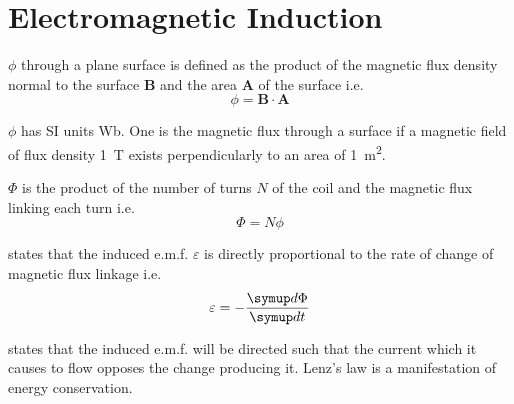 \documentclass[Physics.tex]{subfiles}
\begin{document}
\chapter{Electromagnetic Induction}
 \(\phi\) through a plane surface is defined as the product of the magnetic flux density normal to the surface \(\mathbf{B}\) and the area \(\mathbf{A}\) of the surface i.e. \begin{equation}\phi = \mathbf{B} \cdot \mathbf{A}\end{equation}

\(\phi\) has SI units \si{\weber}. One  is the magnetic flux through a surface if a magnetic field of flux density \SI{1}{\tesla} exists perpendicularly to an area of \SI{1}{\meter\squared}.

 \(\Phi\) is the product of the number of turns \(N\) of the coil and the magnetic flux linking each turn i.e. \begin{equation}\Phi = N\phi\end{equation}

 states that the induced e.m.f. \(\varepsilon\) is directly proportional to the rate of change of magnetic flux linkage i.e. \begin{equation}\varepsilon = -\sldd{\Phi}{t}\end{equation}

 states that the induced e.m.f. will be directed such that the current which it causes to flow opposes the change producing it. Lenz's law is a manifestation of energy conservation.
\end{document}
